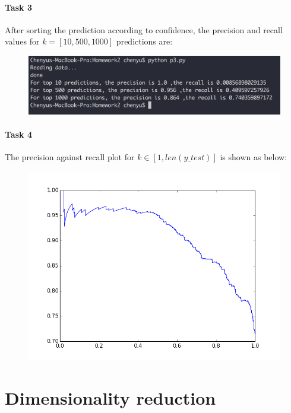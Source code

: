 \documentclass[a4paper,11pt]{article}
\theoremstyle{mytheor}
\begin{document}
\paragraph{Task 3}

After sorting the prediction according to confidence, the precision and recall values for $k = [10, 500, 1000]$ predictions are:

\begin{figure}[h]
\centerline{\includegraphics[width=15cm]{p3.png}}
\end{figure}

\paragraph{Task 4}

The precision against recall plot for $k \in [1, len(y\_test)]$ is shown as below:
\begin{figure}[h]
\centerline{\includegraphics[width=15cm]{p4.png}}
\end{figure}
\clearpage

\section{Dimensionality reduction}
\end{document}
